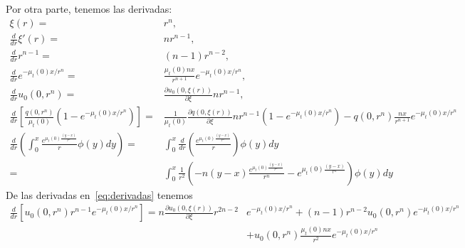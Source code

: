 Por otra parte, tenemos las derivadas:
\begin{equation}
\begin{split}
\xi(r)=&r^n,\\
\frac{d }{dr}\xi'(r)=&nr^{n-1},\\
\frac{d }{dr} r^{n-1}=&(n-1)r^{n-2},\\
\frac{d }{dr} e^{-\mu_t(0)x/r^n}=&\frac{\mu_t(0)nx}{r^{n+1}}e^{-\mu_t(0)x/r^n},\\
\frac{d }{dr} u_0(0,r^n)=&\frac{\partial u_0(0,\xi(r))}{\partial \xi}nr^{n-1},\\
\frac{d }{dr}\left[\frac{q(0,r^n)}{\mu_t(0)}(1-e^{-\mu_t(0)x/r^n}) \right]=&
\frac{1}{\mu_t(0)}\frac{\partial q(0,\xi(r))}{\partial \xi} nr^{n-1} (1-e^{-\mu_t(0)x/r^n})-q(0,r^n)\frac{nx}{r^{n+1}}e^{-\mu_t(0)x/r^n}\\
\frac{d }{dr}\left( \int_0^{x} \frac{e^{\mu_t(0)\frac{(y-x)}{r^n}}}{r} \phi(y) dy \right) =& \int_0^{x} \frac{d }{dr}\left(  \frac{e^{\mu_t(0)\frac{(y-x)}{r^n}}}{r} \right) \phi(y) dy\\
=&\int_0^{x} \frac{1}{r^2} \left(-n(y-x) \frac{e^{\mu_t(0)\frac{(y-x)}{r^n}}}{r^n}
- e^{\mu_t(0)\frac{(y-x)}{r^n}}\right)  \phi(y) dy
\end{split}
\label{eq:derivadas}
\end{equation}
De las derivadas en~\eqref{eq:derivadas} tenemos
\begin{equation}
\begin{split}
\frac{d }{dr} \left[ 
u_0(0,r^n)r^{n-1}e^{-\mu_t(0)x/r^n} \right]=
n\frac{\partial u_0(0,\xi(r))}{\partial \xi}r^{2n-2}&e^{-\mu_t(0)x/r^n} + (n-1) r^{n-2}u_0(0,r^n)e^{-\mu_t(0)x/r^n}\\&+ u_0(0,r^n)\frac{\mu_t(0)nx}{r^{2}}e^{-\mu_t(0)x/r^n}
\end{split}
\label{eq:derivadas2}
\end{equation}

